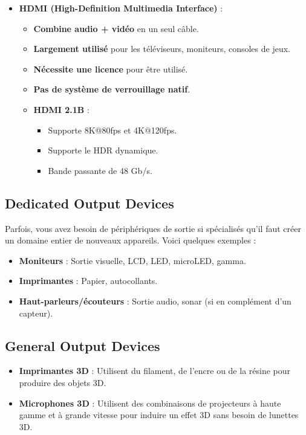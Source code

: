 \documentclass[10pt,a4paper]{article}
\begin{document}
\begin{itemize}
    \item \textbf{HDMI (High-Definition Multimedia Interface)} :
    \begin{itemize}
        \item \textbf{Combine audio + vidéo} en un seul câble.
        \item \textbf{Largement utilisé} pour les téléviseurs, moniteurs, consoles de jeux.
        \item \textbf{Nécessite une licence} pour être utilisé.
        \item \textbf{Pas de système de verrouillage natif}.
        \item \textbf{HDMI 2.1B} :
        \begin{itemize}
            \item Supporte 8K@80fps et 4K@120fps.
            \item Supporte le HDR dynamique.
            \item Bande passante de 48 Gb/s.
        \end{itemize}
    \end{itemize}
\end{itemize}

\subsection*{Dedicated Output Devices}
Parfois, vous avez besoin de périphériques de sortie si spécialisés qu'il faut créer un domaine entier de nouveaux appareils. Voici quelques exemples :
\begin{itemize}
    \item \textbf{Moniteurs} : Sortie visuelle, LCD, LED, microLED, gamma.
    \item \textbf{Imprimantes} : Papier, autocollants.
    \item \textbf{Haut-parleurs/écouteurs} : Sortie audio, sonar (si en complément d'un capteur).
\end{itemize}

\subsection*{General Output Devices}
\begin{itemize}
    \item \textbf{Imprimantes 3D} : Utilisent du filament, de l'encre ou de la résine pour produire des objets 3D.
    \item \textbf{Microphones 3D} : Utilisent des combinaisons de projecteurs à haute gamme et à grande vitesse pour induire un effet 3D sans besoin de lunettes 3D.
\end{itemize}
\end{document}
